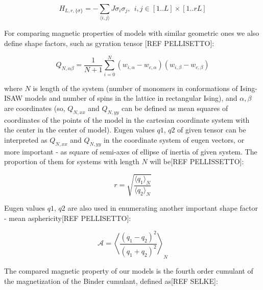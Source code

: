 \documentclass[aps,pre,amssymb,amsmath,twocolumn,floatfix]{revtex4-2}
\begin{document}
\begin{equation}\label{H_Ising_Rectan}
  H_{L, r, \{\sigma\}} = - \sum_{\langle i,j \rangle} J  \sigma_{i}  \sigma_{j},\ \ i,j \in [1..L] \times [1..rL]
\end{equation}


For comparing magnetic properties of models with similar geometric ones we also define shape factors, such as gyration tensor [REF PELLISETTO]:

\begin{equation}\label{eq:Ten_G1}
    Q_{N,\alpha\beta} = \frac{1}{N+1} \sum^{N}_{i=0}(w_{i,\alpha} - w_{c, \alpha})(w_{i,\beta} - w_{c, \beta})
\end{equation}

where $N$ is length of the system (number of monomers in conformations of Ising-ISAW models and number of spins in the lattice in rectangular Ising), and  $\alpha,\beta$ are coordinates (so, $Q_{N, xx}$ and $Q_{N,yy}$ can be defined as mean squares of coordinates of the points of the model in the cartesian coordinate system with the center in the center of model). Eugen values $q1$, $q2$ of given tensor can be interpreted as $Q_{N, xx}$ and $Q_{N,yy}$ in the coordinate system of eugen vectors, or more important - as square of semi-axes of ellipse of inertia of given system. The proportion of them for systems with length $N$ will be[REF PELLISSETTO]: 

\begin{equation}
    r = \sqrt{\frac{\langle q_{1}\rangle_{N}}{\langle q_{2} \rangle_{N}}}
\end{equation}

Eugen values $q1$, $q2$ are also used in enumerating another important shape factor - mean asphericity[REF PELLISETTO]:

\begin{equation}
\label{eq:Asphericity}
    \mathcal{A} = \left\langle \frac{(q_{1} - q_{2})^{2}}{(q_{1} + q_{2})^{2}} \right\rangle_{N}
\end{equation}


The compared magnetic property of our models is the fourth order cumulant of the magnetization of the Binder cumulant, defined as[REF SELKE]:
\end{document}
